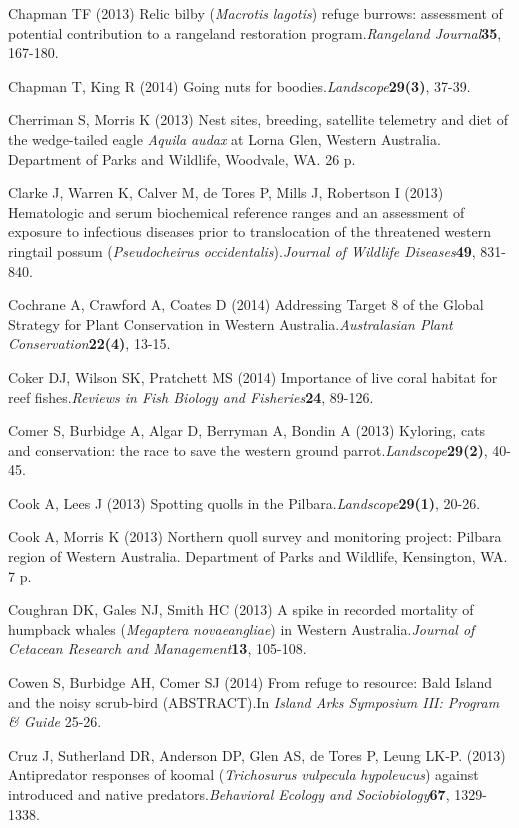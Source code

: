 \documentclass[version=last, paper=a4, DIV=18, usenames, dvipsnames]{scrartcl}
\begin{document}
Chapman TF (2013) Relic bilby (\emph{Macrotis} \emph{lagotis}) refuge burrows: assessment of potential contribution to a rangeland restoration program.\emph{Rangeland Journal}\textbf{35}, 167-180.


Chapman T, King R (2014) Going nuts for boodies.\emph{Landscope}\textbf{29(3)}, 37-39.


Cherriman S, Morris K (2013) Nest sites, breeding, satellite telemetry and diet of the wedge-tailed eagle \emph{Aquila} \emph{audax} at Lorna Glen, Western Australia. Department of Parks and Wildlife, Woodvale, WA. 26 p.


Clarke J, Warren K, Calver M, de Tores P, Mills J, Robertson I (2013) Hematologic and serum biochemical reference ranges and an assessment of exposure to infectious diseases prior to translocation of the threatened western ringtail possum (\emph{Pseudocheirus} \emph{occidentalis}).\emph{Journal of Wildlife Diseases}\textbf{49}, 831-840.


Cochrane A, Crawford A, Coates D (2014) Addressing Target 8 of the Global Strategy for Plant Conservation in Western Australia.\emph{Australasian Plant Conservation}\textbf{22(4)}, 13-15.


Coker DJ, Wilson SK, Pratchett MS (2014) Importance of live coral habitat for reef fishes.\emph{Reviews in Fish Biology and Fisheries}\textbf{24}, 89-126.


Comer S, Burbidge A, Algar D, Berryman A, Bondin A (2013) Kyloring, cats and conservation: the race to save the western ground parrot.\emph{Landscope}\textbf{29(2)}, 40-45.


Cook A, Lees J (2013) Spotting quolls in the Pilbara.\emph{Landscope}\textbf{29(1)}, 20-26.


Cook A, Morris K (2013) Northern quoll survey and monitoring project: Pilbara region of Western Australia. Department of Parks and Wildlife, Kensington, WA. 7 p.


Coughran DK, Gales NJ, Smith HC (2013) A spike in recorded mortality of humpback whales (\emph{Megaptera} \emph{novaeangliae}) in Western Australia.\emph{Journal of Cetacean Research and Management}\textbf{13}, 105-108.


Cowen S, Burbidge AH, Comer SJ (2014) From refuge to resource: Bald Island and the noisy scrub-bird (ABSTRACT).In \emph{Island Arks Symposium III: Program \& Guide} 25-26.


Cruz J, Sutherland DR, Anderson DP, Glen AS, de Tores P, Leung LK-P. (2013) Antipredator responses of koomal (\emph{Trichosurus} \emph{vulpecula} \emph{hypoleucus}) against introduced and native predators.\emph{Behavioral Ecology and Sociobiology}\textbf{67}, 1329-1338.
\end{document}

